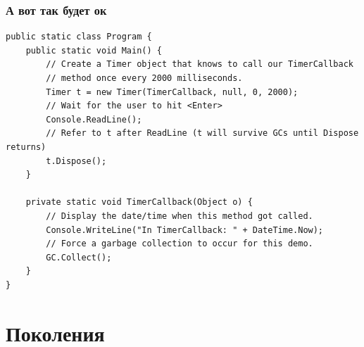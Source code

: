 \documentclass{../../slides-style}
\begin{document}
    \begin{frame}[fragile]
        \frametitle{А вот так будет ок}
        \begin{footnotesize}
            \begin{verbatim}
public static class Program {
    public static void Main() {
        // Create a Timer object that knows to call our TimerCallback
        // method once every 2000 milliseconds.
        Timer t = new Timer(TimerCallback, null, 0, 2000);
        // Wait for the user to hit <Enter>
        Console.ReadLine();
        // Refer to t after ReadLine (t will survive GCs until Dispose returns)
        t.Dispose();
    }

    private static void TimerCallback(Object o) {
        // Display the date/time when this method got called.
        Console.WriteLine("In TimerCallback: " + DateTime.Now);
        // Force a garbage collection to occur for this demo.
        GC.Collect();
    }
}
            \end{verbatim}
        \end{footnotesize}
    \end{frame}

    \section{Поколения}
\end{document}
